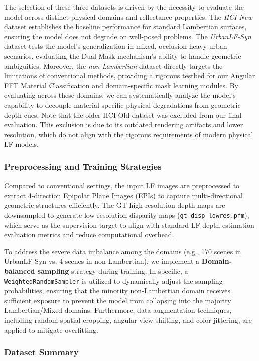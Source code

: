 \documentclass[lettersize,journal]{IEEEtran}
\begin{document}
The selection of these three datasets is driven by the necessity to evaluate the model across distinct physical domains and reflectance properties. The \textit{HCI New} dataset establishes the baseline performance for standard Lambertian surfaces, ensuring the model does not degrade on well-posed problems. The \textit{UrbanLF-Syn} dataset tests the model's generalization in mixed, occlusion-heavy urban scenarios, evaluating the Dual-Mask mechanism's ability to handle geometric ambiguities. Moreover, the \textit{non-Lambertian} dataset directly targets the limitations of conventional methods, providing a rigorous testbed for our Angular FFT Material Classification and domain-specific mask learning modules. By evaluating across these domains, we can systematically analyze the model's capability to decouple material-specific physical degradations from geometric depth cues. Note that the older HCI-Old dataset was excluded from our final evaluation. This exclusion is due to its outdated rendering artifacts and lower resolution, which do not align with the rigorous requirements of modern physical LF models.

\subsubsection{Preprocessing and Training Strategies}

Compared to conventional settings, the input LF images are preprocessed to extract 4-direction Epipolar Plane Images (EPIs) to capture multi-directional geometric structures efficiently. The GT high-resolution depth maps are downsampled to generate low-resolution disparity maps (\texttt{gt\_disp\_lowres.pfm}), which serve as the supervision target to align with standard LF depth estimation evaluation metrics and reduce computational overhead.

To address the severe data imbalance among the domains (e.g., 170 scenes in UrbanLF-Syn vs. 4 scenes in non-Lambertian), we implement a \textbf{Domain-balanced sampling} strategy during training. In specific, a \texttt{WeightedRandomSampler} is utilized to dynamically adjust the sampling probabilities, ensuring that the minority non-Lambertian domain receives sufficient exposure to prevent the model from collapsing into the majority Lambertian/Mixed domains. Furthermore, data augmentation techniques, including random spatial cropping, angular view shifting, and color jittering, are applied to mitigate overfitting.

\subsubsection{Dataset Summary}
\end{document}
